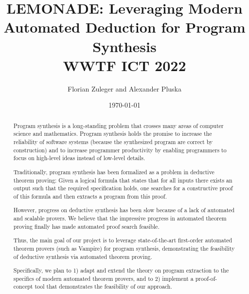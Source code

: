 \documentclass[a4paper,12pt]{article}
\begin{document}
\title{LEMONADE: Leveraging Modern Automated Deduction for Program Synthesis\\
\vspace{0.5cm}
\large{WWTF ICT 2022}}
\author{Florian Zuleger and Alexander Pluska}
\date{\today}
\maketitle


\begin{abstract}

  Program synthesis is a long-standing problem that crosses many areas of computer science and mathematics.
  Program synthesis holds the promise to  increase the reliability of software systems (because the synthesized program are correct by construction) and to increase programmer productivity by enabling programmers to focus on high-level ideas instead of low-level details.

  Traditionally, program synthesis has been formalized as a problem in deductive theorem proving:
  Given a logical formula that states that for all inputs there exists an output such that the required specification holds, one searches for a constructive proof of this formula and then extracts a program from this proof.

  However, progress on deductive synthesis has been slow because of a lack of automated and scalable provers.
  We believe that the impressive progress in automated theorem proving finally has made automated proof search feasible.

  Thus, the main goal of our project is to leverage state-of-the-art first-order automated theorem provers (such as Vampire) for program synthesis, demonstrating the feasibility of deductive synthesis via automated theorem proving.

  Specifically, we plan to 1) adapt and extend the theory on program extraction to the specifics of modern automated theorem provers, and to 2) implement a proof-of-concept tool that demonstrates the feasibility of our approach.
\end{abstract}
\end{document}
